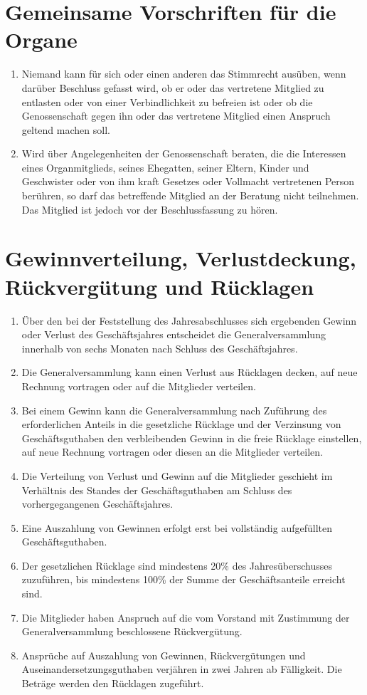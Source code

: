 \documentclass[a4paper, 12pt]{scrartcl}
\begin{document}
\section{Gemeinsame Vorschriften für die Organe}
\begin{enumerate}
  \item Niemand kann für sich oder einen anderen das Stimmrecht ausüben, wenn darüber Beschluss gefasst wird, ob er oder das vertretene Mitglied zu entlasten oder von einer Verbindlichkeit zu befreien ist oder ob die Genossenschaft gegen ihn oder das vertretene Mitglied einen Anspruch geltend machen soll.
  \item Wird über Angelegenheiten der Genossenschaft beraten, die die Interessen eines Organmitglieds, seines Ehegatten, seiner Eltern, Kinder und Geschwister oder von ihm kraft Gesetzes oder Vollmacht vertretenen Person berühren, so darf das betreffende Mitglied an der Beratung nicht teilnehmen. Das Mitglied ist jedoch vor der Beschlussfassung zu hören.
\end{enumerate}

\section{Gewinnverteilung, Verlustdeckung, Rückvergütung und Rücklagen}
\begin{enumerate}
  \item Über den bei der Feststellung des Jahresabschlusses sich ergebenden Gewinn oder Verlust des Geschäftsjahres entscheidet die Generalversammlung innerhalb von sechs Monaten nach Schluss des Geschäftsjahres.
  \item Die Generalversammlung kann einen Verlust aus Rücklagen decken, auf neue Rechnung vortragen oder auf die Mitglieder verteilen.
  \item Bei einem Gewinn kann die Generalversammlung nach Zuführung des erforderlichen Anteils in die gesetzliche Rücklage und der Verzinsung von Geschäftsguthaben den verbleibenden Gewinn in die freie Rücklage einstellen, auf neue Rechnung vortragen oder diesen an die Mitglieder verteilen.
  \item Die Verteilung von Verlust und Gewinn auf die Mitglieder geschieht im Verhältnis des Standes der Geschäftsguthaben am Schluss des vorhergegangenen Geschäftsjahres.
  \item Eine Auszahlung von Gewinnen erfolgt erst bei vollständig aufgefüllten Geschäftsguthaben.
  \item Der gesetzlichen Rücklage sind mindestens 20\% des Jahresüberschusses zuzuführen, bis mindestens 100\% der Summe der Geschäftsanteile erreicht sind.
  \item Die Mitglieder haben Anspruch auf die vom Vorstand mit Zustimmung der Generalversammlung beschlossene Rückvergütung.
  \item Ansprüche auf Auszahlung von Gewinnen, Rückvergütungen und Auseinandersetzungsguthaben verjähren in zwei Jahren ab Fälligkeit. Die Beträge werden den Rücklagen zugeführt.
\end{enumerate}
\end{document}
